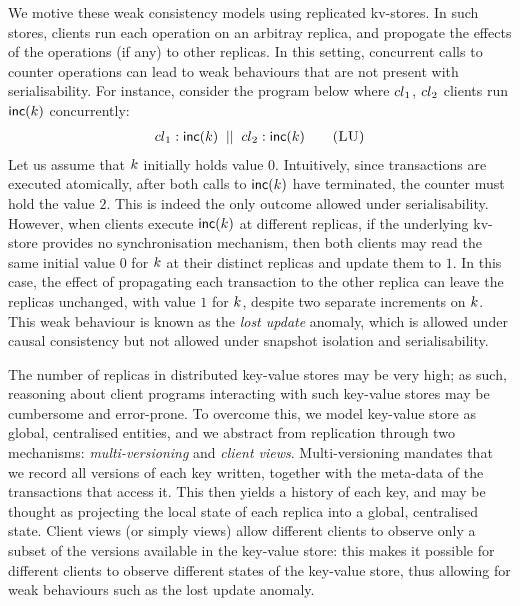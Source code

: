 We motive these weak consistency models using replicated kv-stores. In
such stores, clients run each operation on an arbitray replica, and
propogate the effects of the operations (if any) to other
replicas. In this setting, concurrent calls to counter
operations can lead to weak behaviours that are not present with
serialisability.
%
%
For instance, consider the program below where  ${cl}_1$, ${cl}_2$ clients run $\mathsf{inc}(k)$ concurrently: 
\begin{align}
	\cl_1: \ctrinc(\ke)
	\;\; || \;\;
	\cl_2: \ctrinc(\ke)
	\tag{\textsc{LU}}
	\label{prog:inc2}
\end{align}
Let us assume that  $k$ initially holds value $0$.
Intuitively, since transactions are executed atomically, after both
calls to $\mathsf{inc}(k)$ have terminated, the counter must hold 
the value $2$.
This is indeed the only outcome allowed under serialisability. 
However, when clients execute $\mathsf{inc}(k)$ at different replicas,
if the underlying kv-store provides no synchronisation mechanism,
 then 
both clients may read the same initial value $0$ for $k$ at their
distinct replicas and update them to $1$. 
In this case, the effect of propagating  each transaction to the other
replica can leave  the replicas unchanged, with value  $1$ for $k$, 
despite two separate increments on $k$. 
This weak behaviour is known as the \emph{lost update} anomaly, which
is  allowed under causal consistency but not allowed under snapshot
isolation and serialisability. 

The number of replicas in distributed key-value stores may be very high; 
as such, reasoning about client programs interacting with such key-value 
stores may be cumbersome and error-prone. 
To overcome this, we model key-value store as global, centralised entities, and 
we abstract from replication through two mechanisms: \emph{multi-versioning} and \emph{client views}. 
Multi-versioning mandates that we record all versions of each key written, 
together with the meta-data of the transactions that access it. 
This then yields a history of each key, and may be thought as projecting the local state of each replica into a global, centralised state. 
Client views (or simply views) allow different clients to observe only a subset of the versions available in 
the key-value store: this makes it possible for different clients to observe different states 
of the key-value store, thus allowing for weak behaviours such as the lost update anomaly. 

